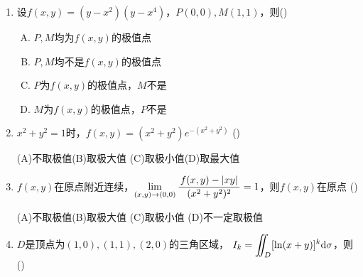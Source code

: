 \begin{enumerate}
  (A) 垂直\hspace{1cm}(B) 平行  \hspace{1cm}(C)夹角为$\pi/4$\hspace{1cm}
  (D)夹角为$\pi/3$
  \item 设$f(x,y)=(y-x^2)(y-x^4)$，$P(0,0),M(1,1)$，则(\underline{\hspace{1cm}})
  \begin{enumerate}[(A)]
    \item $P,M$均为$f(x,y)$的极值点
    \item $P,M$均不是$f(x,y)$的极值点
    \item $P$为$f(x,y)$的极值点，$M$不是
    \item $M$为$f(x,y)$的极值点，$P$不是
  \end{enumerate}
  \item $x^2+y^2=1$时，$f(x,y)=(x^2+y^2)e^{-(x^2+y^2)}$ 
  (\underline{\hspace{1cm}})
  
  (A)不取极值\hspace{1cm}(B)取极大值 \hspace{1cm}
  (C)取极小值\hspace{1cm}(D)取最大值
  \item $f(x,y)$在原点附近连续，$\lim\limits_{(x,y)\to(0,0)}
  \displaystyle\frac{\,{f(x,y)-|xy|}\,}{\,{(x^2+y^2)^2}\,}=1$，则$f(x,y)$在原点
  (\underline{\hspace{1cm}})
  
  (A)不取极值\hspace{1cm}(B)取极大值 \hspace{1cm}(C)取极小值\hspace{1cm}
  (D)不一定取极值
  \item $D$是顶点为$(1,0),(1,1),(2,0)$的三角区域，
  $I_k=\displaystyle\iint_D[\ln(x+y)]^k\mathrm{d}\sigma$，则(\underline{\hspace{1cm}})
  

\end{enumerate}
